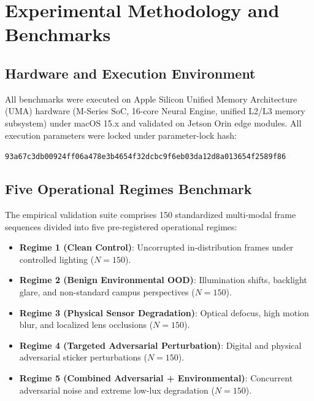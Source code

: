 \documentclass[10pt,journal,compsoc]{IEEEtran}
\begin{document}
\section{Experimental Methodology and Benchmarks}

\subsection{Hardware and Execution Environment}
All benchmarks were executed on Apple Silicon Unified Memory Architecture (UMA) hardware (M-Series SoC, 16-core Neural Engine, unified L2/L3 memory subsystem) under macOS 15.x and validated on Jetson Orin edge modules. All execution parameters were locked under parameter-lock hash:
\begin{center}
\texttt{93a67c3db00924ff06a478e3b4654f32dcbc9f6eb03da12d8a013654f2589f86}
\end{center}

\subsection{Five Operational Regimes Benchmark}
The empirical validation suite comprises 150 standardized multi-modal frame sequences divided into five pre-registered operational regimes:
\begin{itemize}
    \item \textbf{Regime 1 (Clean Control)}: Uncorrupted in-distribution frames under controlled lighting ($N=150$).
    \item \textbf{Regime 2 (Benign Environmental OOD)}: Illumination shifts, backlight glare, and non-standard campus perspectives ($N=150$).
    \item \textbf{Regime 3 (Physical Sensor Degradation)}: Optical defocus, high motion blur, and localized lens occlusions ($N=150$).
    \item \textbf{Regime 4 (Targeted Adversarial Perturbation)}: Digital and physical adversarial sticker perturbations ($N=150$).
    \item \textbf{Regime 5 (Combined Adversarial + Environmental)}: Concurrent adversarial noise and extreme low-lux degradation ($N=150$).
\end{itemize}
\end{document}
